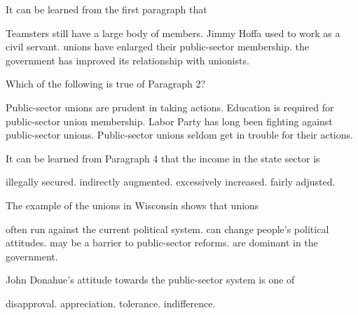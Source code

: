 \item It can be learned from the first paragraph that
\begin{tasks}
	\task Teamsters still have a large body of members.
	\task Jimmy Hoffa used to work as a civil servant.
	\task unions have enlarged their public-sector membership.
	\task the government has improved its relationship with unionists.
\end{tasks}
\item Which of the following is true of Paragraph 2?
\begin{tasks}
	\task Public-sector unions are prudent in taking actions.
	\task Education is required for public-sector union membership.
	\task Labor Party has long been fighting against public-sector unions.
	\task Public-sector unions seldom get in trouble for their actions.
\end{tasks}
\item It can be learned from Paragraph 4 that the income in the state sector is
\begin{tasks}
	\task illegally secured.
	\task indirectly augmented.
	\task excessively increased.
	\task fairly adjusted.
\end{tasks}
\item The example of the unions in Wisconsin shows that unions
\begin{tasks}
	\task often run against the current political system.
	\task can change people's political attitudes.
	\task may be a barrier to public-sector reforms.
	\task are dominant in the government.
\end{tasks}
\item John Donahue's attitude towards the public-sector system is one of
\begin{tasks}
	\task disapproval.
	\task appreciation.
	\task tolerance.
	\task indifference.
\end{tasks}